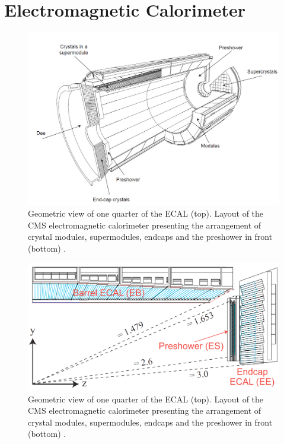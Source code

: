 \section{Electromagnetic Calorimeter} \label{sec-ElectromagneticCalorimeter}

\begin{figure}\label{fig-ECAL}
\includegraphics[width=\textwidth]{Figures/ECAL.png}
\caption{Geometric view of one quarter of the ECAL (top). Layout of the CMS electromagnetic calorimeter presenting the arrangement of crystal modules, supermodules, endcaps and the preshower in front (bottom) \cite{CMSexperiment}.}
\end{figure}

\begin{figure}\label{fig-ECALRapidity}
\includegraphics[width=\textwidth]{Figures/ECALRapidity.png}
\caption{Geometric view of one quarter of the ECAL (top). Layout of the CMS electromagnetic calorimeter presenting the arrangement of crystal modules, supermodules, endcaps and the preshower in front (bottom) \cite{CMSexperiment}.}
\end{figure}

